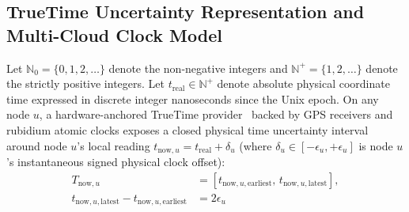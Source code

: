 \documentclass[conference,10pt]{IEEEtran}
\begin{document}
\subsection{TrueTime Uncertainty Representation and Multi-Cloud Clock Model}
Let $\mathbb{N}_0 = \{0, 1, 2, \dots\}$ denote the non-negative integers and $\mathbb{N}^+ = \{1, 2, \dots\}$ denote the strictly positive integers. Let $t_{\text{real}} \in \mathbb{N}^+$ denote absolute physical coordinate time expressed in discrete integer nanoseconds since the Unix epoch. On any node $u$, a hardware-anchored TrueTime provider~\cite{corbett2013spanner} backed by GPS receivers and rubidium atomic clocks exposes a closed physical time uncertainty interval around node $u$'s local reading $t_{\text{now},u} = t_{\text{real}} + \delta_u$ (where $\delta_u \in [-\epsilon_u, +\epsilon_u]$ is node $u$'s instantaneous signed physical clock offset):
\begin{equation}
\begin{split}
T_{\text{now},u} &= [t_{\text{now},u,\text{earliest}},\, t_{\text{now},u,\text{latest}}], \\
t_{\text{now},u,\text{latest}} - t_{\text{now},u,\text{earliest}} &= 2\epsilon_u
\end{split}
\label{eq:truetime_interval}
\end{equation}
\end{document}
